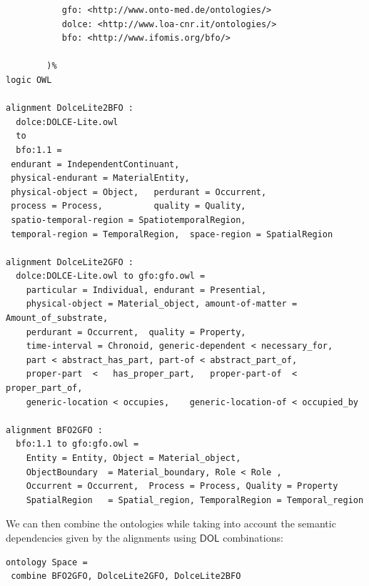 \documentclass[10pt,%
\ifpretendfinal
final%
\else
draft%
\fi,
]{scrreprt}
\newcommand*{\DOL}{\ensuremath{\mathsf{DOL}}\xspace}
\begin{document}
\begin{lstlisting}[basicstyle=\ttfamily\footnotesize,language=dolText,morekeywords={props,ObjectProperty,Class,DisjointUnionOf,SubClassOf,Characteristics,Transitive,Asymmetric,SubPropertyOf,DisjointClasses,EquivalentTo,inverse,only,forall,iff,if,or,exists,bridge,distributed,from},escapechar=@,mathescape]
%prefix(
           gfo: <http://www.onto-med.de/ontologies/>
           dolce: <http://www.loa-cnr.it/ontologies/>
           bfo: <http://www.ifomis.org/bfo/>
           
        )%
logic OWL

alignment DolceLite2BFO :
  dolce:DOLCE-Lite.owl
  to
  bfo:1.1 =
 endurant = IndependentContinuant,
 physical-endurant = MaterialEntity,
 physical-object = Object,   perdurant = Occurrent,
 process = Process,          quality = Quality,
 spatio-temporal-region = SpatiotemporalRegion,
 temporal-region = TemporalRegion,  space-region = SpatialRegion

alignment DolceLite2GFO :
  dolce:DOLCE-Lite.owl to gfo:gfo.owl =
 	particular = Individual, endurant = Presential,
 	physical-object = Material_object, amount-of-matter = Amount_of_substrate,
 	perdurant = Occurrent, 	quality = Property,
 	time-interval = Chronoid, generic-dependent < necessary_for,
 	part < abstract_has_part, part-of < abstract_part_of,
 	proper-part  <	 has_proper_part,  	proper-part-of  < proper_part_of,
 	generic-location < occupies, 	generic-location-of < occupied_by

alignment BFO2GFO :
  bfo:1.1 to gfo:gfo.owl =
	Entity = Entity, Object = Material_object,
	ObjectBoundary  = Material_boundary, Role < Role ,
 	Occurrent = Occurrent, 	Process = Process, Quality = Property
 	SpatialRegion 	= Spatial_region, TemporalRegion = Temporal_region 	
\end{lstlisting}

We can then combine the ontologies while taking into account the semantic dependencies given by the alignments using
\DOL combinations:

\begin{lstlisting}[basicstyle=\ttfamily\footnotesize,language=dolText,morekeywords={props,ObjectProperty,Class,DisjointUnionOf,SubClassOf,Characteristics,Transitive,Asymmetric,SubPropertyOf,DisjointClasses,EquivalentTo,inverse,only,forall,iff,if,or,exists,bridge,distributed,from},escapechar=@,mathescape]
ontology Space =
 combine BFO2GFO, DolceLite2GFO, DolceLite2BFO
\end{lstlisting} 
\end{document}
